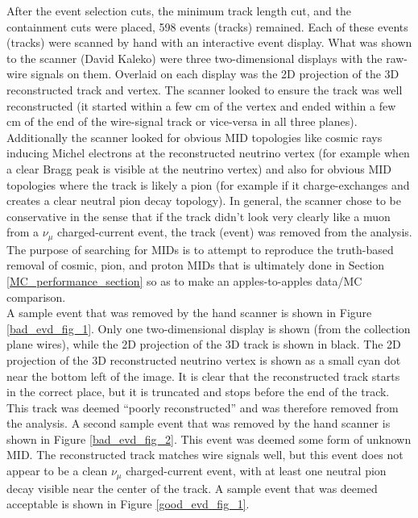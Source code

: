 After the event selection cuts, the minimum track length cut, and the containment cuts were placed, 598 events (tracks) remained. Each of these events (tracks) were scanned by hand with an interactive event display. What was shown to the scanner (David Kaleko) were three two-dimensional displays with the raw-wire signals on them. Overlaid on each display was the 2D projection of the 3D reconstructed track and vertex. The scanner looked to ensure the track was well reconstructed (it started within a few cm of the vertex and ended within a few cm of the end of the wire-signal track or vice-versa in all three planes). Additionally the scanner looked for obvious MID topologies like cosmic rays inducing Michel electrons at the reconstructed neutrino vertex (for example when a clear Bragg peak is visible at the neutrino vertex) and also for obvious MID topologies where the track is likely a pion (for example if it charge-exchanges and creates a clear neutral pion decay topology). In general, the scanner chose to be conservative in the sense that if the track didn't look very clearly like a muon from a $\nu_\mu$ charged-current event, the track (event) was removed from the analysis. The purpose of searching for MIDs is to attempt to reproduce the truth-based removal of cosmic, pion, and proton MIDs that is ultimately done in Section \ref{MC_performance_section} so as to make an apples-to-apples data/MC comparison.\\

A sample event that was removed by the hand scanner is shown in Figure \ref{bad_evd_fig_1}. Only one two-dimensional display is shown (from the collection plane wires), while the 2D projection of the 3D track is shown in black. The 2D projection of the 3D reconstructed neutrino vertex is shown as a small cyan dot near the bottom left of the image. It is clear that the reconstructed track starts in the correct place, but it is truncated and stops before the end of the track. This track was deemed ``poorly reconstructed'' and was therefore removed from the analysis. A second sample event that was removed by the hand scanner is shown in Figure \ref{bad_evd_fig_2}. This event was deemed some form of unknown MID. The reconstructed track matches wire signals well, but this event does not appear to be a clean $\nu_\mu$ charged-current event, with at least one neutral pion decay visible near the center of the track. A sample event that was deemed acceptable is shown in Figure \ref{good_evd_fig_1}.

